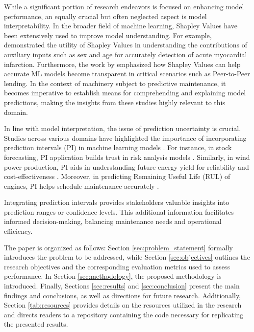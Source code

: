 \documentclass{IEEEtran}
\begin{document}
        While a significant portion of research endeavors is focused on enhancing model performance, an equally crucial but often neglected aspect is model interpretability. In the broader field of machine learning, Shapley Values have been extensively used to improve model understanding. For example, \cite{shap-health} demonstrated the utility of Shapley Values in understanding the contributions of auxiliary inputs such as sex and age for accurately detection of acute myocardial infarction. Furthermore, the work by \cite{shap-credit-lending} emphasized how Shapley Values can help accurate ML models become transparent in critical scenarios such as Peer-to-Peer lending. In the context of machinery subject to predictive maintenance, it becomes imperative to establish means for comprehending and explaining model predictions, making the insights from these studies highly relevant to this domain.

        In line with model interpretation, the issue of prediction uncertainty is crucial. Studies across various domains have highlighted the importance of incorporating prediction intervals (PI) in machine learning models \cite{pi-motivation}. For instance, in stock forecasting, PI application builds trust in risk analysis models \cite{pi-stock}. Similarly, in wind power production, PI aids in understanding future energy yield for reliability and cost-effectiveness \cite{pi-wind-power}. Moreover, in predicting Remaining Useful Life (RUL) of engines, PI helps schedule maintenance accurately \cite{pi-dl-rul}.

        Integrating prediction intervals provides stakeholders valuable insights into prediction ranges or confidence levels. This additional information facilitates informed decision-making, balancing maintenance needs and operational efficiency.

        The paper is organized as follows: Section \ref{sec:problem_statement} formally introduces the problem to be addressed, while Section \ref{sec:objectives} outlines the research objectives and the corresponding evaluation metrics used to assess performance. In Section \ref{sec:methodology}, the proposed methodology is introduced. Finally, Sections \ref{sec:results} and \ref{sec:conclusion} present the main findings and conclusions, as well as directions for future research. Additionally, Section \ref{tab:resources} provides details on the resources utilized in the research and directs readers to a repository containing the code necessary for replicating the presented results.
\end{document}
